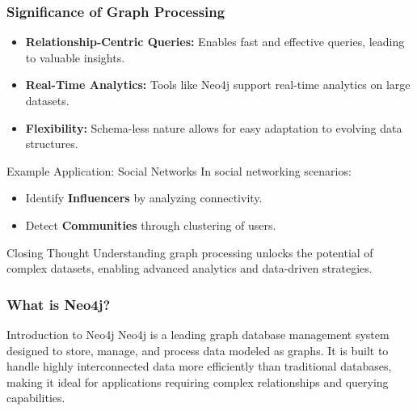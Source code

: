 \documentclass[aspectratio=169]{beamer}
\begin{document}
\begin{frame}[fragile]
    \frametitle{Significance of Graph Processing}
    \begin{itemize}
        \item \textbf{Relationship-Centric Queries:} Enables fast and effective queries, leading to valuable insights.
        \item \textbf{Real-Time Analytics:} Tools like Neo4j support real-time analytics on large datasets.
        \item \textbf{Flexibility:} Schema-less nature allows for easy adaptation to evolving data structures.
    \end{itemize}
    
    \begin{block}{Example Application: Social Networks}
        In social networking scenarios:
        \begin{itemize}
            \item Identify \textbf{Influencers} by analyzing connectivity.
            \item Detect \textbf{Communities} through clustering of users.
        \end{itemize}
    \end{block}
    
    \begin{block}{Closing Thought}
        Understanding graph processing unlocks the potential of complex datasets, enabling advanced analytics and data-driven strategies.
    \end{block}
\end{frame}

\begin{frame}[fragile]
    \frametitle{What is Neo4j?}
    \begin{block}{Introduction to Neo4j}
        Neo4j is a leading graph database management system designed to store, manage, and process data modeled as graphs. It is built to handle highly interconnected data more efficiently than traditional databases, making it ideal for applications requiring complex relationships and querying capabilities.
    \end{block}
\end{frame}
\end{document}

